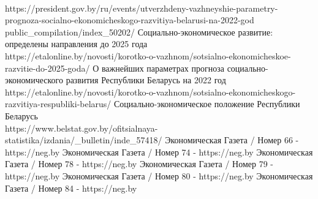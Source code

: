 \documentclass[14pt,a4paper]{article}
\begin{document}
\begin{center}
\begin{thebibliography}{10}
            \\
            https://president.gov.by/ru/events/utverzhdeny-vazhneyshie-parametry-prognoza-socialno-ekonomicheskogo-razvitiya-belarusi-na-2022-god
            public\_compilation/index\_50202/
             Социально-экономическое развитие: определены направления до 2025 года
            \\
            https://etalonline.by/novosti/korotko-o-vazhnom/sotsialno-ekonomicheskoe-razvitie-do-2025-goda/
             О важнейших параметрах прогноза социально-экономического развития Республики Беларусь на 2022 год
            \\
            https://etalonline.by/novosti/korotko-o-vazhnom/sotsialno-ekonomicheskogo-razvitiya-respubliki-belarus/
             Социально-экономическое положение Республики Беларусь
            \\
            https://www.belstat.gov.by/ofitsialnaya-statistika/izdania/\_bulletin/inde\_57418/
             Экономическая Газета / Номер 66 - https://neg.by
             Экономическая Газета / Номер 74 - https://neg.by
             Экономическая Газета / Номер 78 - https://neg.by
             Экономическая Газета / Номер 79 - https://neg.by
             Экономическая Газета / Номер 80 - https://neg.by
             Экономическая Газета / Номер 84 - https://neg.by
        \end{thebibliography}
    \end{center}
\end{document}

